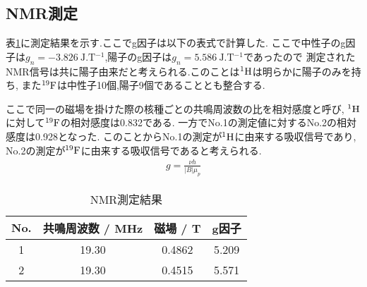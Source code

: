 \subsection{NMR測定}
表\ref{tab:nmr}に測定結果を示す.ここでg因子は以下の表式で計算した.
ここで中性子のg因子は$g_n=-3.826\ \si{\joule.\tesla^{-1}}$,陽子のg因子は$g_n=5.586\ \si{\joule.\tesla^{-1}}$であったので
測定されたNMR信号は共に陽子由来だと考えられる.このことは$^1{\rm H}$は明らかに陽子のみを持ち,
また$^{19}{\rm F}$は中性子10個,陽子9個であることとも整合する.

ここで同一の磁場を掛けた際の核種ごとの共鳴周波数の比を相対感度と呼び,
$^1{\rm H}$に対して$^{19}{\rm F}$の相対感度は0.832である.\cite{kakujiki}
一方でNo.1の測定値に対するNo.2の相対感度は0.928となった.
このことからNo.1の測定が$^1{\rm H}$に由来する吸収信号であり,
No.2の測定が$^{19}{\rm F}$に由来する吸収信号であると考えられる.
\begin{align}
  g=\frac{\nu h}{|B|\mu_p}
\end{align}
\begin{table}[h]
\caption{NMR測定結果}
\label{tab:nmr}
\centering
\begin{tabular}{cccc}
\hline
No.&共鳴周波数 / MHz&磁場 / T&g因子\\
\hline \hline
1&19.30&0.4862&5.209\\
2&19.30&0.4515&5.571\\
\hline
\end{tabular}
\end{table}